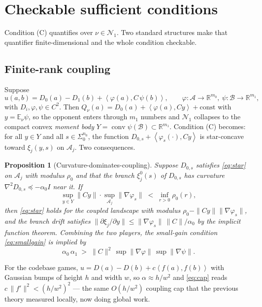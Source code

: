 \documentclass[11pt]{article}
\newtheorem{proposition}{Proposition}
\theoremstyle{definition}
\newcommand{\R}{\mathbb{R}}
\newcommand{\E}{\mathbb{E}}
\newcommand{\cA}{\mathcal{A}}
\newcommand{\cB}{\mathcal{B}}
\newcommand{\cN}{\mathcal{N}}
\newcommand{\ip}[2]{\left\langle #1, #2 \right\rangle}
\DeclareMathOperator{\conv}{conv}
\begin{document}
\section{Checkable sufficient conditions}\label{sec:check}

Condition (C) quantifies over $\nu \in \cN_1$. Two standard structures make that
quantifier finite-dimensional and the whole condition checkable.

\subsection{Finite-rank coupling}

Suppose
\begin{equation}\label{eq:G1}
  u(a,b) = D_0(a) - D_1(b) + \ip{\varphi(a)}{C\,\psi(b)},
  \qquad \varphi : \cA \to \R^{m_0},\ \psi : \cB \to \R^{m_1},
\end{equation}
with $D_i, \varphi, \psi \in C^2$. Then $Q_\nu(a) = D_0(a) + \ip{\varphi(a)}{Cy}
+ \mathrm{const}$ with $y = \E_\nu \psi$, so the opponent enters through
$m_1$ numbers and $\cN_1$ collapses to the compact convex \emph{moment body}
$Y = \conv \psi(\cB) \subset \R^{m_1}$. Condition (C) becomes: for all $y \in Y$
and all $s \in \Sigma_0^{n_0}$, the function
$D_{0,s} + \ip{\varphi_s(\cdot)}{Cy}$ is star-concave toward $\xi_j(y,s)$ on
$\cA_j$. Two consequences.

\begin{proposition}[Curvature-dominates-coupling]\label{prop:cap}
Suppose $D_{0,s}$ satisfies \eqref{eq:star} on $\cA_j$ with modulus $\rho_0$ and
that the branch $\xi_j^{0}(s)$ of $D_{0,s}$ has curvature $\nabla^2 D_{0,s} \preceq
-\alpha_0 I$ near it. If
\begin{equation}
  \sup_{y \in Y} \|C y\| \cdot \sup_{\cA_j} \|\nabla \varphi_s\| \;<\;
  \inf_{r>0} \rho_0(r),
\end{equation}
then \eqref{eq:star} holds for the coupled landscape with modulus
$\rho_0 - \|Cy\|\|\nabla\varphi_s\|$, and the branch drift satisfies
$\|\partial \xi_j/\partial y\| \le \|\nabla \varphi_s\|\,\|C\|/\alpha_0$ by the
implicit function theorem. Combining the two players, the small-gain condition
\eqref{eq:smallgain} is implied by
\begin{equation}\label{eq:cap}
  \alpha_0\, \alpha_1 \;>\; \|C\|^2\, \sup\|\nabla\varphi\|\, \sup\|\nabla\psi\| .
\end{equation}
\end{proposition}

For the codebase games, $u = D(a) - D(b) + c\ip{f(a)}{f(b)}$ with Gaussian bumps
of height $h$ and width $w$, so $\alpha \approx h/w^2$ and \eqref{eq:cap} reads
$c\,\|f'\|^2 < (h/w^2)^2$ --- the same $O(h/w^2)$ coupling cap that the previous
theory measured locally, now doing global work.
\end{document}
